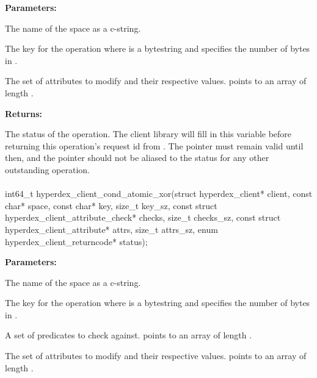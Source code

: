 \noindent\textbf{Parameters:}
\begin{description}[labelindent=\widthof{{\code{attrs}, \code{attrs\_sz}}},leftmargin=*,noitemsep,nolistsep,align=right]
\item[\code{space}] The name of the space as a c-string.
\item[\code{key}, \code{key\_sz}] The key for the operation where  is a bytestring and  specifies the number of bytes in .
\item[\code{attrs}, \code{attrs\_sz}] The set of attributes to modify and their respective values.   points to an array of length .
\end{description}

\noindent\textbf{Returns:}
\begin{description}[labelindent=\widthof{{\code{status}}},leftmargin=*,noitemsep,nolistsep,align=right]
\item[\code{status}] The status of the operation.  The client library will fill in this variable before returning this operation's request id from .  The pointer must remain valid until then, and the pointer should not be aliased to the status for any other outstanding operation.
\end{description}

\paragraph{}
\label{api:c:cond_atomic_xor}
\begin{ccode}
int64_t hyperdex_client_cond_atomic_xor(struct hyperdex_client* client,
                const char* space,
                const char* key, size_t key_sz,
                const struct hyperdex_client_attribute_check* checks, size_t checks_sz,
                const struct hyperdex_client_attribute* attrs, size_t attrs_sz,
                enum hyperdex_client_returncode* status);
\end{ccode}
\funcdesc 

\noindent\textbf{Parameters:}
\begin{description}[labelindent=\widthof{{\code{checks}, \code{checks\_sz}}},leftmargin=*,noitemsep,nolistsep,align=right]
\item[\code{space}] The name of the space as a c-string.
\item[\code{key}, \code{key\_sz}] The key for the operation where  is a bytestring and  specifies the number of bytes in .
\item[\code{checks}, \code{checks\_sz}] A set of predicates to check against.   points to an array of length .
\item[\code{attrs}, \code{attrs\_sz}] The set of attributes to modify and their respective values.   points to an array of length .
\end{description}

